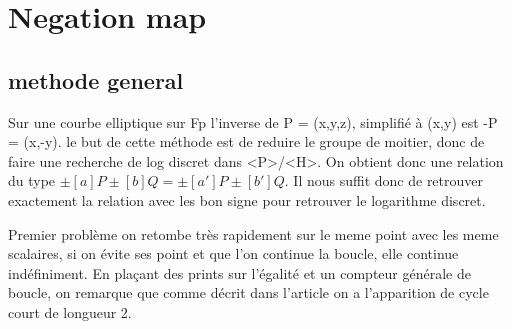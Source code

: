 \documentclass[a4paper,10pt]{report}
\begin{document}
% 
% 
% 
% 
% 
% 
% 
% 
% 
% 
% 
% 
% 
% 
% 

\chapter{Negation map}

\section{methode general}

Sur une courbe elliptique sur Fp l'inverse de P = (x,y,z), simplifié à (x,y) est -P = (x,-y). le but de cette méthode est de reduire le groupe de moitier,
donc de faire une recherche de log discret dans <P>/<H>. On obtient donc une relation du type $\pm[a]P \pm[b]Q = \pm[a']P \pm[b']Q$. Il nous suffit donc de retrouver exactement 
la relation avec les bon signe pour retrouver le logarithme discret.

Premier problème on retombe très rapidement sur le meme point avec les meme scalaires, si on évite ses point et que l'on continue la boucle, elle continue indéfiniment.
En plaçant des prints sur l'égalité et un compteur générale de boucle, on remarque que comme décrit dans l'article on a l'apparition de cycle court de longueur 2.
\end{document}
